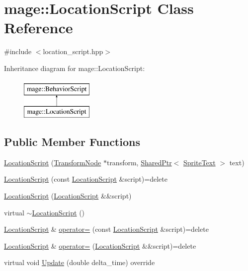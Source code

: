 \hypertarget{classmage_1_1_location_script}{}\section{mage\+:\+:Location\+Script Class Reference}
\label{classmage_1_1_location_script}


{\ttfamily \#include $<$location\+\_\+script.\+hpp$>$}

Inheritance diagram for mage\+:\+:Location\+Script\+:\begin{figure}[H]
\begin{center}
\leavevmode
\includegraphics[height=2.000000cm]{classmage_1_1_location_script}
\end{center}
\end{figure}
\subsection*{Public Member Functions}
\begin{DoxyCompactItemize}
\item 
\hyperlink{classmage_1_1_location_script_a14bc9a5868daff6401b0c8b4feebbb3e}{Location\+Script} (\hyperlink{classmage_1_1_transform_node}{Transform\+Node} $\ast$transform, \hyperlink{namespacemage_a1e01ae66713838a7a67d30e44c67703e}{Shared\+Ptr}$<$ \hyperlink{classmage_1_1_sprite_text}{Sprite\+Text} $>$ text)
\item 
\hyperlink{classmage_1_1_location_script_a53fb0562896eadb4c747d53b53f65b40}{Location\+Script} (const \hyperlink{classmage_1_1_location_script}{Location\+Script} \&script)=delete
\item 
\hyperlink{classmage_1_1_location_script_a6cddb54a11e5d5d6dee034ef04ffbf2f}{Location\+Script} (\hyperlink{classmage_1_1_location_script}{Location\+Script} \&\&script)
\item 
virtual \hyperlink{classmage_1_1_location_script_a95ed60a4bd7d228cc28ce1622f254d75}{$\sim$\+Location\+Script} ()
\item 
\hyperlink{classmage_1_1_location_script}{Location\+Script} \& \hyperlink{classmage_1_1_location_script_a49409b091dbd1b93830c46831be453fb}{operator=} (const \hyperlink{classmage_1_1_location_script}{Location\+Script} \&script)=delete
\item 
\hyperlink{classmage_1_1_location_script}{Location\+Script} \& \hyperlink{classmage_1_1_location_script_a6e2ad5cd12a984d38c66bbcc81fef94b}{operator=} (\hyperlink{classmage_1_1_location_script}{Location\+Script} \&\&script)=delete
\item 
virtual void \hyperlink{classmage_1_1_location_script_a3ffe0474c573e2cf858aee62056324a3}{Update} (double delta\+\_\+time) override
\end{DoxyCompactItemize}
